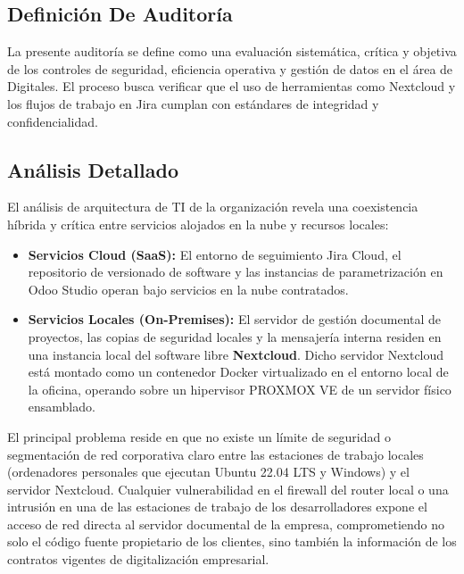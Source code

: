 \documentclass[12pt]{article}
\begin{document}
\subsection{Definición De Auditoría}
La presente auditoría se define como una evaluación sistemática, crítica y objetiva de los controles de seguridad, eficiencia operativa y gestión de datos en el área de Digitales. El proceso busca verificar que el uso de herramientas como Nextcloud y los flujos de trabajo en Jira cumplan con estándares de integridad y confidencialidad.

\subsection{Análisis Detallado}
El análisis de arquitectura de TI de la organización revela una coexistencia híbrida y crítica entre servicios alojados en la nube y recursos locales:
\begin{itemize}
    \item \textbf{Servicios Cloud (SaaS):} El entorno de seguimiento Jira Cloud, el repositorio de versionado de software y las instancias de parametrización en Odoo Studio operan bajo servicios en la nube contratados.
    \item \textbf{Servicios Locales (On-Premises):} El servidor de gestión documental de proyectos, las copias de seguridad locales y la mensajería interna residen en una instancia local del software libre \textbf{Nextcloud}. Dicho servidor Nextcloud está montado como un contenedor Docker virtualizado en el entorno local de la oficina, operando sobre un hipervisor PROXMOX VE de un servidor físico ensamblado.
\end{itemize}
El principal problema reside en que no existe un límite de seguridad o segmentación de red corporativa claro entre las estaciones de trabajo locales (ordenadores personales que ejecutan Ubuntu 22.04 LTS y Windows) y el servidor Nextcloud. Cualquier vulnerabilidad en el firewall del router local o una intrusión en una de las estaciones de trabajo de los desarrolladores expone el acceso de red directa al servidor documental de la empresa, comprometiendo no solo el código fuente propietario de los clientes, sino también la información de los contratos vigentes de digitalización empresarial.
\end{document}

